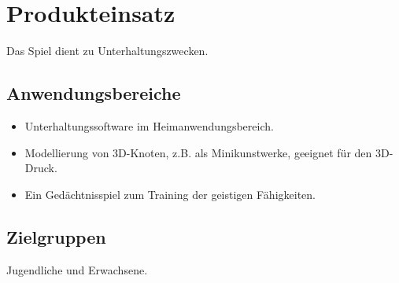 \chapter{Produkteinsatz}

Das Spiel dient zu Unterhaltungszwecken.

\section{Anwendungsbereiche}


\begin{itemize}

	\item Unterhaltungssoftware im Heimanwendungsbereich. 
	
	\item Modellierung von 3D-Knoten,
	z.B. als Minikunstwerke, geeignet für den 3D-Druck.
	
	\item Ein Gedächtnisspiel zum Training der
	geistigen Fähigkeiten. 
	
\end{itemize}

\section{Zielgruppen}

Jugendliche und Erwachsene.





